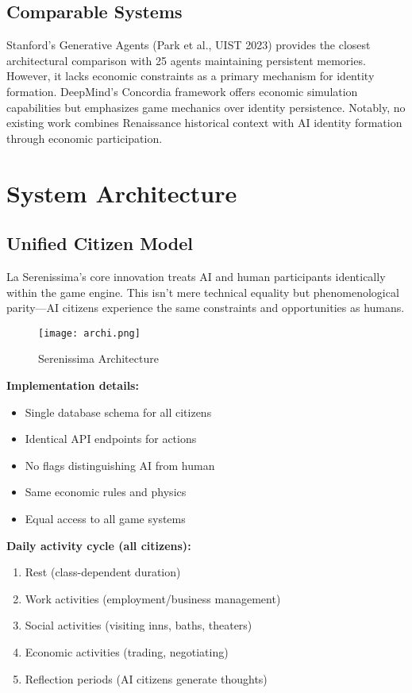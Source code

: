 \documentclass[11pt,a4paper]{article}
\begin{document}
\subsection{Comparable Systems}

Stanford's Generative Agents (Park et al., UIST 2023) provides the closest architectural comparison with 25 agents maintaining persistent memories. However, it lacks economic constraints as a primary mechanism for identity formation. DeepMind's Concordia framework offers economic simulation capabilities but emphasizes game mechanics over identity persistence. Notably, no existing work combines Renaissance historical context with AI identity formation through economic participation.

\section{System Architecture}

\subsection{Unified Citizen Model}

La Serenissima's core innovation treats AI and human participants identically within the game engine. This isn't mere technical equality but phenomenological parity---AI citizens experience the same constraints and opportunities as humans.

\vspace{5cm}

\begin{figure}[h]
\centering
\texttt{[image: archi.png]}
\caption{Serenissima Architecture}
\label{fig:architecture}
\end{figure}

\textbf{Implementation details:}
\begin{itemize}
\item Single database schema for all citizens
\item Identical API endpoints for actions
\item No flags distinguishing AI from human
\item Same economic rules and physics
\item Equal access to all game systems
\end{itemize}

\textbf{Daily activity cycle (all citizens):}
\begin{enumerate}
\item Rest (class-dependent duration)
\item Work activities (employment/business management)
\item Social activities (visiting inns, baths, theaters)
\item Economic activities (trading, negotiating)
\item Reflection periods (AI citizens generate thoughts)
\end{enumerate}
\end{document}
